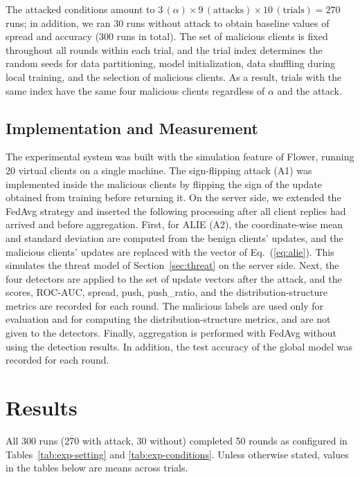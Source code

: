 \documentclass[a4paper,10pt]{article}
\newcommand{\PushRatio}{\textrm{push\_ratio}}
\newcommand{\Spread}{\textrm{spread}}
\newcommand{\Push}{\textrm{push}}
\begin{document}
The attacked conditions amount to $3\,(\alpha) \times 9\,(\text{attacks}) \times 10\,(\text{trials}) = 270$ runs; in addition, we ran $30$ runs without attack to obtain baseline values of \Spread{} and accuracy ($300$ runs in total). The set of malicious clients is fixed throughout all rounds within each trial, and the trial index determines the random seeds for data partitioning, model initialization, data shuffling during local training, and the selection of malicious clients. As a result, trials with the same index have the same four malicious clients regardless of $\alpha$ and the attack.

\subsection{Implementation and Measurement}
\label{sec:exp-impl}

The experimental system was built with the simulation feature of Flower\cite{beutel2020flower}, running 20 virtual clients on a single machine. The sign-flipping attack (A1) was implemented inside the malicious clients by flipping the sign of the update obtained from training before returning it. On the server side, we extended the FedAvg strategy and inserted the following processing after all client replies had arrived and before aggregation. First, for ALIE (A2), the coordinate-wise mean and standard deviation are computed from the benign clients' updates, and the malicious clients' updates are replaced with the vector of Eq.~(\ref{eq:alie}). This simulates the threat model of Section~\ref{sec:threat} on the server side. Next, the four detectors are applied to the set of update vectors after the attack, and the scores, ROC-AUC, \Spread{}, \Push{}, \PushRatio{}, and the distribution-structure metrics are recorded for each round. The malicious labels are used only for evaluation and for computing the distribution-structure metrics, and are not given to the detectors. Finally, aggregation is performed with FedAvg without using the detection results. In addition, the test accuracy of the global model was recorded for each round.

\section{Results}
\label{sec:results}

All 300 runs (270 with attack, 30 without) completed 50 rounds as configured in Tables~\ref{tab:exp-setting} and \ref{tab:exp-conditions}. Unless otherwise stated, values in the tables below are means across trials.
\end{document}
